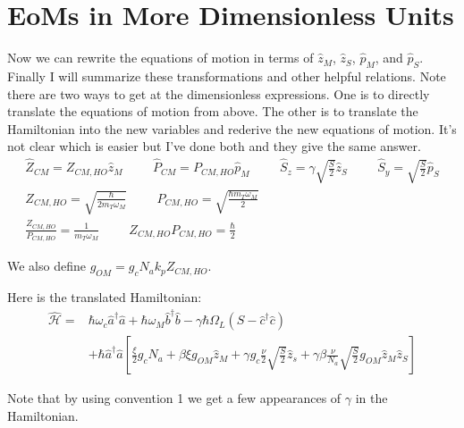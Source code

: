 \documentclass[12pt]{article}
\begin{document}
\section{EoMs in More Dimensionless Units}
Now we can rewrite the equations of motion in terms of $\hat{z}_M$, $\hat{z}_S$, $\hat{p}_M$, and $\hat{p}_S$. Finally I will summarize these transformations and other helpful relations. Note there are two ways to get at the dimensionless expressions. One is to directly translate the equations of motion from above. The other is to translate the Hamiltonian into the new variables and rederive the new equations of motion. It's not clear which is easier but I've done both and they give the same answer.
\begin{align}
\hat{Z}_{CM} = Z_{CM,HO} \hat{z}_M \hspace {1cm}
\hat{P}_{CM} = P_{CM,HO} \hat{p}_M \hspace {1cm}
\hat{S}_z = \gamma\sqrt{\frac{S}{2}} \hat{z}_S \hspace{1cm}
\hat{S}_y = \sqrt{\frac{S}{2}} \hat{p}_S \\
Z_{CM,HO} = \sqrt{\frac{\hbar}{2 m_T \omega_M}} \hspace{1cm}
P_{CM,HO} = \sqrt{\frac{\hbar m_T \omega_M}{2}} \hspace{1cm}\\
\frac{Z_{CM,HO}}{P_{CM,HO}} = \frac{1}{m_T \omega_M} \hspace{1cm}
Z_{CM,HO} P_{CM,HO} = \frac{\hbar}{2}
\end{align}

We also define $g_{OM} = g_c N_a k_p Z_{CM,HO}$.

Here is the translated Hamiltonian:
\begin{align}
 \widehat{\mathcal{H}} =& 
\hbar \omega_c \hat{a}^{\dag} \hat{a} 
+ \hbar \omega_M \hat{b}^{\dag} \hat{b} 
- \gamma \hbar \Omega_L (S-\hat{c}^{\dag} \hat{c}) \\
&+ \hbar \hat{a}^{\dag} \hat{a} \left[
\frac{\xi}{2} g_c N_a 
+ \beta \xi g_{OM} \hat{z}_{M} 
+ \gamma g_c \frac{\nu}{2} \sqrt{\frac{S}{2}} \hat{z}_{s}
+ \gamma \beta \frac{\nu}{N_a} \sqrt{\frac{S}{2}} g_{OM} \hat{z}_{M} \hat{z}_{S}
\right]
\end{align}

Note that by using convention 1 we get a few appearances of $\gamma$ in the Hamiltonian.
\end{document}
